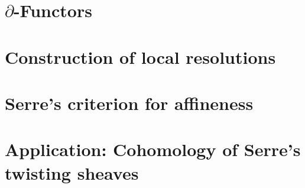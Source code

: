 \documentclass{../util/zariski-small}
\begin{document}
\section{$\partial$-Functors}


\section{Construction of local resolutions}


\section{Serre's criterion for affineness}


\section{Application: Cohomology of Serre's twisting sheaves}


\printindex

\printbibliography
\end{document}
